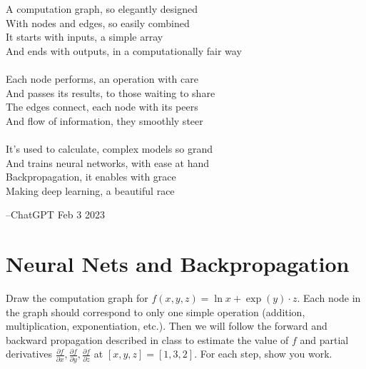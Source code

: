 \begin{table}
\vspace{-2cm}
 \begin{framed}
 \footnotesize
A computation graph, so elegantly designed\\
With nodes and edges, so easily combined\\
It starts with inputs, a simple array \\
 And ends with outputs, in a computationally fair way \\\\ 
Each node performs, an operation with care\\
And passes its results, to those waiting to share\\
The edges connect, each node with its peers\\
And flow of information, they smoothly steer\\\\
It's used to calculate, complex models so grand\\
And trains neural networks, with ease at hand\\
Backpropagation, it enables with grace\\
Making deep learning, a beautiful race

\hspace{4cm}--ChatGPT Feb 3 2023 
\end{framed}
\end{table}
\section{Neural Nets and Backpropagation}
Draw the computation graph for $f(x, y, z) = \ln x + \exp(y) \cdot z$. Each node in the graph should correspond to only one simple operation (addition, multiplication, exponentiation, etc.). Then we will follow the forward and backward propagation described in class to estimate the value of $f$ and partial derivatives $\frac{\partial f}{\partial x}, \frac{\partial f}{\partial y}, \frac{\partial f}{\partial z}$ at $[x, y, z] = [1, 3, 2]$. For each step, show you work.  \\ \\ \\
    

